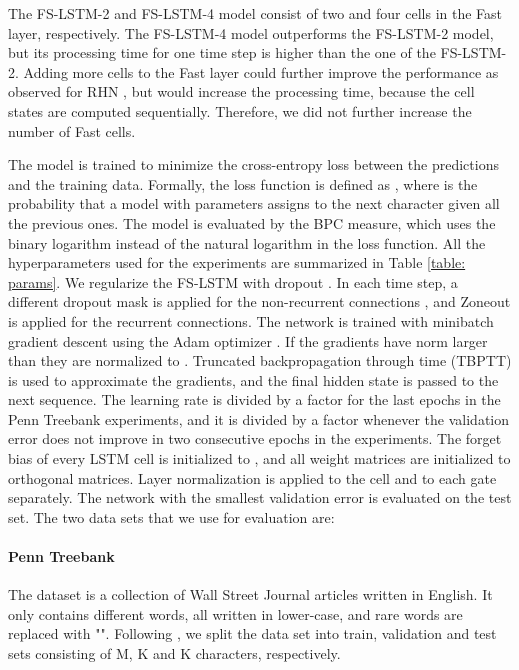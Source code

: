 \documentclass{article}
\begin{document}
The FS-LSTM-2 and FS-LSTM-4 model consist of two and four cells in the Fast layer, respectively.  The FS-LSTM-4 model outperforms the FS-LSTM-2 model, but its processing time for one time step is  higher than the one of the FS-LSTM-2. Adding more cells to the Fast layer could further improve the performance as observed for RHN \cite{zilly2016recurrent}, but would increase the processing time, because  the cell states are computed sequentially. Therefore, we did not further increase the number of Fast cells. 





The model is trained to minimize the cross-entropy loss between the predictions and the training data. Formally, the loss function is defined as , where  is the probability that a model with parameters  assigns to the next character  given all the previous ones. The model is evaluated by the BPC measure, which uses the binary logarithm instead of the natural logarithm in the loss function.  All the hyperparameters used for the experiments are summarized in Table \ref{table: params}. We regularize the FS-LSTM with dropout \cite{srivastava2014dropout}.  In each time step,  a different dropout mask is applied for the non-recurrent connections \cite{zaremba14rnndropout}, and  Zoneout \cite{krueger16zoneout} is applied for the recurrent connections. The network is trained with minibatch gradient descent  using the Adam optimizer \cite{kingma14adam}. If the gradients have norm larger than  they are normalized to . Truncated backpropagation through time (TBPTT) \cite{rumelhart1988learning, elman90entropy} is used to approximate the gradients, and the final hidden state is passed to the next sequence. The learning rate is divided by a factor   for the last  epochs in the Penn Treebank experiments, and it is divided by a factor  whenever the validation error does not improve in two consecutive epochs in the  experiments. The forget bias of every LSTM cell  is initialized to , and all weight matrices are initialized to orthogonal matrices. Layer normalization \cite{ba16layernorm} is applied to the cell and to each gate separately. The network with the smallest validation error is evaluated on the test set. The two data sets that we use for evaluation are:


\paragraph{Penn Treebank \cite{marcus1993ptb}} The dataset is a collection of Wall Street Journal articles written in English. It only contains  different words, all written in lower-case, and rare words are replaced with "". Following \cite{mikolov2012ptb_division}, we split the data set into train, validation and test sets consisting of M, K and K characters, respectively.
\end{document}
